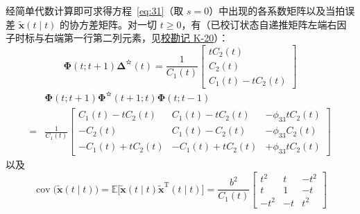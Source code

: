 \begin{example}
经简单代数计算即可求得方程~\eqref{eq:31}（取 $s = 0$）中出现的各系数矩阵以及当拍误差 $\tilde{\bm{x}}(t \mid t)$ 的协方差矩阵。对一切 $t \geq 0$，有（已校订状态自递推矩阵左端右因子时标与右端第一行第二列元素，见\hyperref[sec:k20]{校勘记 K-20}）：
\begin{equation*}
\bm{\Phi}(t; t + 1)\bm{\Delta}^{\text{✫}}(t) = \frac{1}{C_1(t)} \begin{bmatrix} tC_2(t) \\ C_2(t) \\ C_1(t) - tC_2(t) \end{bmatrix}
\end{equation*}
\begin{equation*}
\begin{aligned}
&\bm{\Phi}(t; t + 1)\bm{\Phi}^{\text{✫}}(t + 1; t)\bm{\Phi}(t; t - 1) \\
= &\frac{1}{C_1(t)} \begin{bmatrix} C_1(t) - tC_2(t) & C_1(t) - tC_2(t) & -\phi_{33}tC_2(t) \\ -C_2(t) & C_1(t) - C_2(t) & -\phi_{33}C_2(t) \\ -C_1(t) + tC_2(t) & -C_1(t) + tC_2(t) & +\phi_{33}tC_2(t) \end{bmatrix}
\end{aligned}
\end{equation*}
以及
\begin{equation*}
\operatorname{cov}\bigl(\tilde{\bm{x}}(t \mid t)\bigr) = \mathbb{E}\bigl[\tilde{\bm{x}}(t \mid t)\tilde{\bm{x}}^{\mathrm{T}}(t \mid t)\bigr] = \frac{b^2}{C_1(t)} \begin{bmatrix} t^2 & t & -t^2 \\ t & 1 & -t \\ -t^2 & -t & t^2 \end{bmatrix}
\end{equation*}


\end{example}
